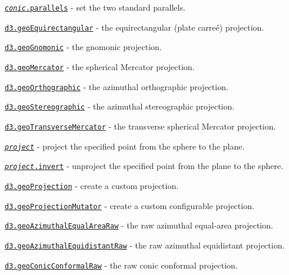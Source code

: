 \begin{DoxyItemize}
\item \href{https://github.com/d3/d3-geo/blob/master/README.md#conic_parallels}{\tt {\itshape conic}.parallels} -\/ set the two standard parallels.
\item \href{https://github.com/d3/d3-geo/blob/master/README.md#geoEquirectangular}{\tt d3.\+geo\+Equirectangular} -\/ the equirectangular (plate carreé) projection.
\item \href{https://github.com/d3/d3-geo/blob/master/README.md#geoGnomonic}{\tt d3.\+geo\+Gnomonic} -\/ the gnomonic projection.
\item \href{https://github.com/d3/d3-geo/blob/master/README.md#geoMercator}{\tt d3.\+geo\+Mercator} -\/ the spherical Mercator projection.
\item \href{https://github.com/d3/d3-geo/blob/master/README.md#geoOrthographic}{\tt d3.\+geo\+Orthographic} -\/ the azimuthal orthographic projection.
\item \href{https://github.com/d3/d3-geo/blob/master/README.md#geoStereographic}{\tt d3.\+geo\+Stereographic} -\/ the azimuthal stereographic projection.
\item \href{https://github.com/d3/d3-geo/blob/master/README.md#geoTransverseMercator}{\tt d3.\+geo\+Transverse\+Mercator} -\/ the transverse spherical Mercator projection.
\item \href{https://github.com/d3/d3-geo/blob/master/README.md#_project}{\tt {\itshape project}} -\/ project the specified point from the sphere to the plane.
\item \href{https://github.com/d3/d3-geo/blob/master/README.md#project_invert}{\tt {\itshape project}.invert} -\/ unproject the specified point from the plane to the sphere.
\item \href{https://github.com/d3/d3-geo/blob/master/README.md#geoProjection}{\tt d3.\+geo\+Projection} -\/ create a custom projection.
\item \href{https://github.com/d3/d3-geo/blob/master/README.md#geoProjectionMutator}{\tt d3.\+geo\+Projection\+Mutator} -\/ create a custom configurable projection.
\item \href{https://github.com/d3/d3-geo/blob/master/README.md#geoAzimuthalEqualAreaRaw}{\tt d3.\+geo\+Azimuthal\+Equal\+Area\+Raw} -\/ the raw azimuthal equal-\/area projection.
\item \href{https://github.com/d3/d3-geo/blob/master/README.md#geoAzimuthalEquidistantRaw}{\tt d3.\+geo\+Azimuthal\+Equidistant\+Raw} -\/ the raw azimuthal equidistant projection.
\item \href{https://github.com/d3/d3-geo/blob/master/README.md#geoConicConformalRaw}{\tt d3.\+geo\+Conic\+Conformal\+Raw} -\/ the raw conic conformal projection.

\end{DoxyItemize}
